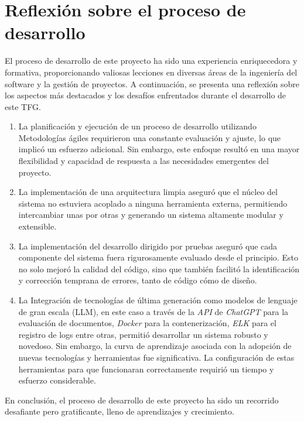 \section{Reflexión sobre el proceso de desarrollo}

El proceso de desarrollo de este proyecto ha sido una experiencia enriquecedora y formativa, proporcionando valiosas
lecciones en diversas áreas de la ingeniería del software y la gestión de proyectos.
A continuación, se presenta una reflexión sobre los aspectos más destacados y los desafíos enfrentados durante el
desarrollo de este TFG.

\begin{enumerate}
    \item
    La planificación y ejecución de un proceso de desarrollo utilizando Metodologías ágiles requirieron una
    constante evaluación y ajuste, lo que implicó un esfuerzo adicional.
    Sin embargo, este enfoque resultó en una mayor flexibilidad y capacidad de respuesta a las necesidades emergentes
    del proyecto.

    \item
    La implementación de una arquitectura limpia aseguró que el núcleo del sistema no estuviera acoplado a ninguna
    herramienta externa, permitiendo intercambiar unas por otras y generando un sistema altamente modular y extensible.

    \item
    La implementación del desarrollo dirigido por pruebas aseguró que cada componente del sistema fuera
    rigurosamente evaluado desde el principio.
    Esto no solo mejoró la calidad del código, sino que también facilitó la identificación y corrección temprana de
    errores, tanto de código cómo de diseño.

    \item
    La Integración de tecnologías de última generación como modelos de lenguaje de gran escala (LLM), en este
    caso a través de la \textit{API} de \textit{ChatGPT} para la evaluación de documentos, \textit{Docker}
    para la contenerización, \textit{ELK} para el registro de logs entre otras, permitió desarrollar un sistema
    robusto y novedoso.
    Sin embargo, la curva de aprendizaje asociada con la adopción de nuevas tecnologías y herramientas fue
    significativa.
    La configuración de estas herramientas para que funcionaran correctamente requirió un tiempo y esfuerzo
    considerable.
\end{enumerate}

En conclusión, el proceso de desarrollo de este proyecto ha sido un recorrido desafiante pero gratificante, lleno de
aprendizajes y crecimiento.
